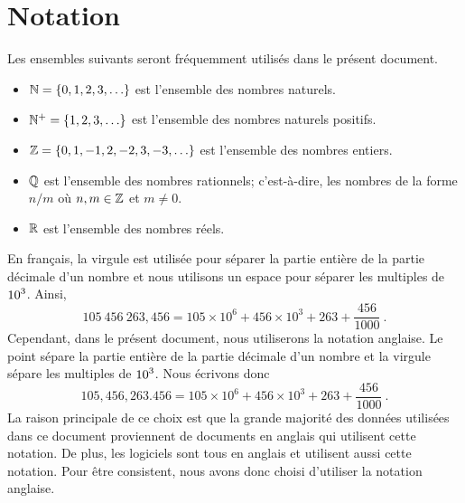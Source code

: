 \section*{Notation}

\begin{defn*}
Les ensembles suivants seront fréquemment utilisés dans le présent
document.
\begin{itemize}
\item $\mathbb{N} = \{0,1,2,3,\ldots \}$ est l'ensemble des nombres naturels.
\item $\mathbb{N}^+ = \{1,2,3,\ldots \}$ est l'ensemble des nombres naturels
positifs.
\item $\mathbb{Z} = \{0,1,-1,2,-2,3,-3, \ldots \}$ est l'ensemble des nombres
entiers.
\item $\mathbb{Q}$ est l'ensemble des nombres rationnels; c'est-à-dire, les
  nombres de la forme $n/m$ où $n,m \in \mathbb{Z}$ et $m \neq 0$.
\item $\mathbb{R}$ est l'ensemble des nombres réels.
\end{itemize}
\end{defn*}

En français, la virgule est utilisée pour séparer la partie entière de
la partie décimale d'un nombre et nous utilisons un espace pour séparer
les multiples de $\displaystyle 10^3$.  Ainsi,
\[
105\ 456\ 263,456 =
105\times 10^6+ 456\times 10^3 + 263 + \frac{456}{1000} \ .
\]
Cependant, dans le présent document, nous utiliserons la notation
anglaise.  Le point sépare la partie entière de la partie décimale d'un
nombre et la virgule sépare les multiples de $\displaystyle 10^3$.  Nous écrivons donc
\[
105,456,263.456 = 105\times 10^6+ 456\times 10^3 + 263 + \frac{456}{1000} \ .
\]
La raison principale de ce choix est que la grande majorité des
données utilisées dans ce document proviennent de documents en anglais
qui utilisent cette notation.  De plus, les logiciels sont tous en
anglais et utilisent aussi cette notation.  Pour être consistent, nous
avons donc choisi d'utiliser la notation anglaise.



